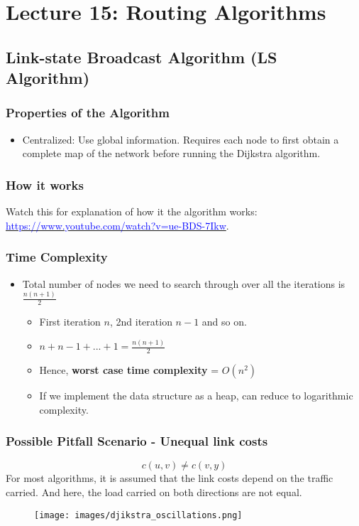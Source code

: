 \documentclass[a4paper]{article}
\begin{document}
\newpage
\section{Lecture 15: Routing Algorithms}
\subsection{Link-state Broadcast Algorithm (LS Algorithm)}
\subsubsection{Properties of the Algorithm}
\begin{itemize}
    \item Centralized: Use global information. Requires each node to first obtain a complete map of the network before running the Dijkstra algorithm.
\end{itemize}

\subsubsection{How it works}
Watch this for explanation of how it the algorithm works: \href{https://www.youtube.com/watch?v=ue-BDS-7Ikw}{\textcolor{blue}{https://www.youtube.com/watch?v=ue-BDS-7Ikw}}. 

\subsubsection{Time Complexity}
\begin{itemize}
    \item Total number of nodes we need to search through over all the iterations is $\displaystyle\frac{n(n+1)}{2}$
    \begin{itemize}[label=$\circ$]
        \item First iteration $n$, 2nd iteration $n-1$ and so on. 
        \item $n + n-1 + ... + 1 = \displaystyle\frac{n(n+1)}{2}$
        \item Hence, \textbf{worst case time complexity} = $O(n^2)$
        \item If we implement the data structure as a heap, can reduce to logarithmic complexity.
    \end{itemize}
\end{itemize}

\subsubsection{Possible Pitfall Scenario - Unequal link costs}
$$c(u,v) \neq c(v,y)$$
For most algorithms, it is assumed that the link costs depend on the traffic carried. And here, the load carried on both directions are not equal.
\begin{figure}[H]
    \centering
    \texttt{[image: images/djikstra\_oscillations.png]}
\end{figure}
\end{document}
